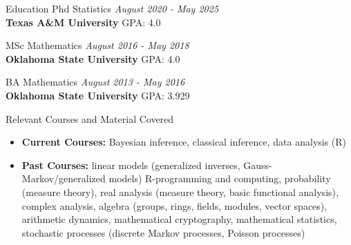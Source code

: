\documentclass{resume} %
\begin{document}
\begin{rSection}{Education}
Phd Statistics \hfill {\em August 2020 - May 2025} \\
{\bf Texas A\&M University}  \hfill {GPA: 4.0} 

MSc Mathematics \hfill {\em August 2016 - May 2018} \\
{\bf Oklahoma State University}  \hfill {GPA: 4.0} 

BA Mathematics \hfill {\em August 2013 - May 2016} \\
{\bf Oklahoma State University} \hfill {GPA: 3.929} \\
\end{rSection}


\begin{rSection}{Relevant Courses and Material Covered}
\begin{itemize}
\item \textbf{Current Courses:} Bayesian inference, classical inference, data analysis (R)

\item \textbf{Past Courses:} linear models (generalized inverses, Gauss-Markov/generalized models) R-programming and computing, probability (measure theory), real analysis (measure theory, basic functional analysis),
complex analysis, algebra (groups, rings, fields, modules, vector spaces), arithmetic dynamics,
mathematical cryptography, mathematical statistics, stochastic processes (discrete Markov processes, Poisson processes)
\end{itemize} 
\end{rSection}
\end{document}
